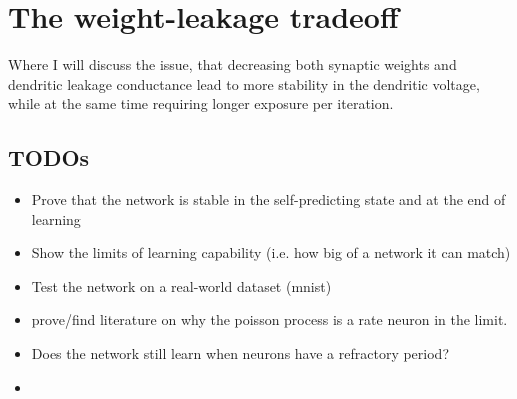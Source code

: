 \documentclass[12pt,a4paper,titlepage]{report}
\begin{document}
\chapter{The weight-leakage tradeoff}

Where I will discuss the issue, that decreasing both synaptic weights and dendritic leakage conductance
lead to more stability in the dendritic voltage, while at the same time requiring longer exposure
per iteration.


\section*{TODOs}

\begin{itemize}
  \item Prove that the network is stable in the self-predicting state and at the end of learning
  \item Show the limits of learning capability (i.e. how big of a network it can match)
  \item Test the network on a real-world dataset (mnist)
  \item prove/find literature on why the poisson process is a rate neuron in the limit.
  \item Does the network still learn when neurons have a refractory period?
  \item 
\end{itemize}

\newpage

\end{document}
